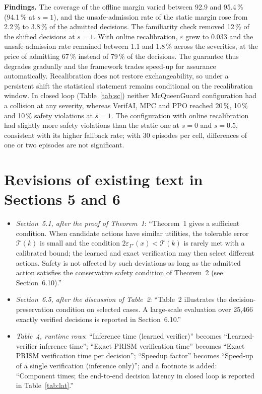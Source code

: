 \documentclass[11pt]{article}
\begin{document}
\textbf{Findings.} The coverage of the offline margin varied between 92.9 and 95.4\,\% (94.1\,\% at $s=1$), and the unsafe-admission rate of the static margin rose from 2.2\,\% to 3.8\,\% of the admitted decisions. The familiarity check removed 12\,\% of the shifted decisions at $s=1$. With online recalibration, $\varepsilon$ grew to 0.033 and the unsafe-admission rate remained between 1.1 and 1.8\,\% across the severities, at the price of admitting 67\,\% instead of 79\,\% of the decisions. The guarantee thus degrades gradually and the framework trades speed-up for assurance automatically. Recalibration does not restore exchangeability, so under a persistent shift the statistical statement remains conditional on the recalibration window. In closed loop (Table~\ref{tab:sc}) neither McQueenGuard configuration had a collision at any severity, whereas VerifAI, MPC and PPO reached 20\,\%, 10\,\% and 10\,\% safety violations at $s=1$. The configuration with online recalibration had slightly more safety violations than the static one at $s=0$ and $s=0.5$, consistent with its higher fallback rate; with 30 episodes per cell, differences of one or two episodes are not significant.

\section*{Revisions of existing text in Sections 5 and 6}
\begin{itemize}[leftmargin=1.3em,itemsep=2pt]
\item \emph{Section~5.1, after the proof of Theorem~1}: ``Theorem~1 gives a sufficient condition. When candidate actions have similar utilities, the tolerable error $\mathcal{T}(k)$ is small and the condition $2\varepsilon_{\Gamma'}(x)<\mathcal{T}(k)$ is rarely met with a calibrated bound; the learned and exact verification may then select different actions. Safety is not affected by such deviations as long as the admitted action satisfies the conservative safety condition of Theorem~2 (see Section~6.10).''
\item \emph{Section~6.5, after the discussion of Table~2}: ``Table~2 illustrates the decision-preservation condition on selected cases. A large-scale evaluation over 25,466 exactly verified decisions is reported in Section~6.10.''
\item \emph{Table~4, runtime rows}: ``Inference time (learned verifier)'' becomes ``Learned-verifier inference time''; ``Exact PRISM verification time'' becomes ``Exact PRISM verification time per decision''; ``Speedup factor'' becomes ``Speed-up of a single verification (inference only)''; and a footnote is added: ``Component times; the end-to-end decision latency in closed loop is reported in Table~\ref{tab:lat}.''
\end{itemize}
\end{document}
